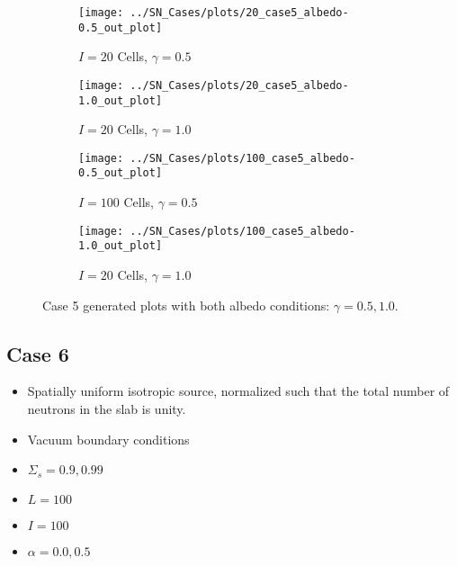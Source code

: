 \documentclass{NE515}
\theoremstyle{definition}
\begin{document}
    \begin{figure}
        \centering
        \begin{subfigure}{0.45\linewidth}
            \centering
            \texttt{[image: ../SN\_Cases/plots/20\_case5\_albedo-0.5\_out\_plot]}
            \caption{$I=20$ Cells, $\gamma = 0.5$}
        \end{subfigure}
        \hfill
        \begin{subfigure}{0.45\linewidth}
            \centering
            \texttt{[image: ../SN\_Cases/plots/20\_case5\_albedo-1.0\_out\_plot]}
            \caption{$I=20$ Cells, $\gamma = 1.0$}
        \end{subfigure}
        \hfill
        \begin{subfigure}{0.45\linewidth}
            \centering
            \texttt{[image: ../SN\_Cases/plots/100\_case5\_albedo-0.5\_out\_plot]}
            \caption{$I=100$ Cells, $\gamma = 0.5$}
        \end{subfigure}
        \hfill
        \begin{subfigure}{0.45\linewidth}
            \centering
            \texttt{[image: ../SN\_Cases/plots/100\_case5\_albedo-1.0\_out\_plot]}
            \caption{$I=20$ Cells, $\gamma = 1.0$}
        \end{subfigure}

        \caption{Case 5 generated plots with both albedo conditions: $\gamma = 0.5, 1.0$.}
        \label{fig:case-5}
    \end{figure}
    \clearpage

    \subsection{Case 6}
    \begin{itemize}
        \item Spatially uniform isotropic source, normalized such that the total number of neutrons in the slab is unity.
        \item Vacuum boundary conditions
        \item $\Sigma_s=0.9,0.99$
        \item $L=100$
        \item $I=100$
        \item $\alpha=0.0,0.5$
    \end{itemize}
\end{document}
